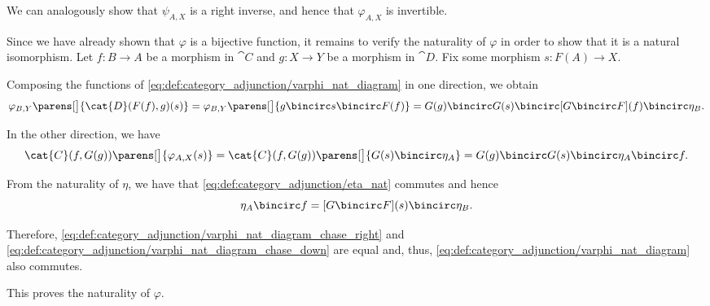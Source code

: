 \begin{defproof}
  We can analogously show that \( \psi_{A,X} \) is a right inverse, and hence that \( \varphi_{A,X} \) is invertible.

  Since we have already shown that \( \varphi \) is a bijective function, it remains to verify the naturality of \( \varphi \) in order to show that it is a natural isomorphism. Let \( f: B \to A \) be a morphism in \( \cat{C} \) and \( g: X \to Y \) be a morphism in \( \cat{D} \). Fix some morphism \( s: F(A) \to X \).

  Composing the functions of \eqref{eq:def:category_adjunction/varphi_nat_diagram} in one direction, we obtain
  \begin{equation}\label{eq:def:category_adjunction/varphi_nat_diagram_chase_right}
    \varphi_{B, Y}\parens[\big]{ \cat{D}(F(f), g)(s) }
    =
    \varphi_{B, Y}\parens[\big]{ g \bincirc s \bincirc F(f) }
    =
    G(g) \bincirc G(s) \bincirc [G \bincirc F](f) \bincirc \eta_B.
  \end{equation}

  In the other direction, we have
  \begin{equation}\label{eq:def:category_adjunction/varphi_nat_diagram_chase_down}
    \cat{C}(f, G(g))\parens[\big]{ \varphi_{A, X}(s) }
    =
    \cat{C}(f, G(g))\parens[\big]{ G(s) \bincirc \eta_A }
    =
    G(g) \bincirc G(s) \bincirc \eta_A \bincirc f.
  \end{equation}

  From the naturality of \( \eta \), we have that \eqref{eq:def:category_adjunction/eta_nat} commutes and hence
  \begin{equation*}
    \eta_A \bincirc f
    =
    [G \bincirc F](s) \bincirc \eta_B.
  \end{equation*}

  Therefore, \eqref{eq:def:category_adjunction/varphi_nat_diagram_chase_right} and \eqref{eq:def:category_adjunction/varphi_nat_diagram_chase_down} are equal and, thus, \eqref{eq:def:category_adjunction/varphi_nat_diagram} also commutes.

  This proves the naturality of \( \varphi \).
\end{defproof}

